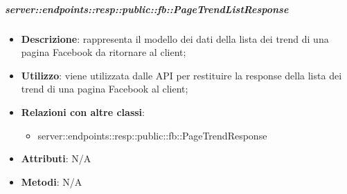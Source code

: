     \subparagraph{server::endpoints::resp::public::fb::PageTrendListResponse} %
    \label{subp:bdsm_app_server_endpoints_resp_public_fb_pagetrendlistresponse}
    \begin{itemize}
      \item \textbf{Descrizione}: rappresenta il modello dei dati della lista dei trend di una pagina Facebook da ritornare al client;
      \item \textbf{Utilizzo}: viene utilizzata dalle API per restituire la response della lista dei trend di una pagina Facebook al client;
      \item \textbf{Relazioni con altre classi}:
        \begin{itemize}
          \item server::endpoints::resp::public::fb::PageTrendResponse
        \end{itemize}
    \item \textbf{Attributi}: N/A
    \item \textbf{Metodi}: N/A
      \end{itemize}

